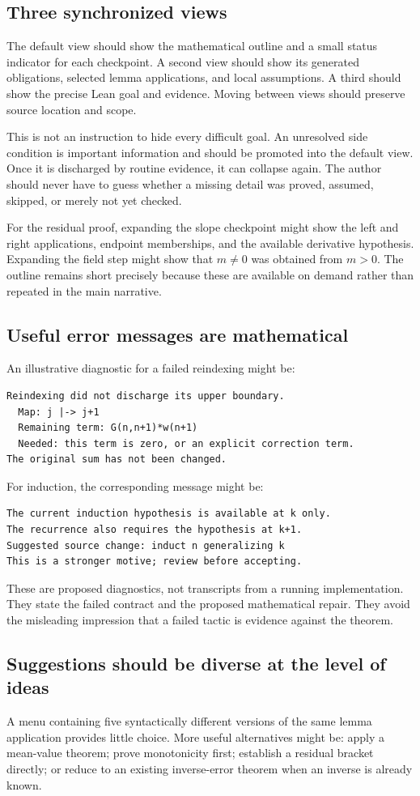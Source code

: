 \documentclass[11pt,a4paper]{article}
\theoremstyle{definition}
\theoremstyle{remark}
\numberwithin{equation}{section}
\begin{document}
\subsection{Three synchronized views}
The default view should show the mathematical outline and a small status indicator for each checkpoint. A second view should show its generated obligations, selected lemma applications, and local assumptions. A third should show the precise Lean goal and evidence. Moving between views should preserve source location and scope.

This is not an instruction to hide every difficult goal. An unresolved side condition is important information and should be promoted into the default view. Once it is discharged by routine evidence, it can collapse again. The author should never have to guess whether a missing detail was proved, assumed, skipped, or merely not yet checked.

For the residual proof, expanding the slope checkpoint might show the left and right applications, endpoint memberships, and the available derivative hypothesis. Expanding the field step might show that $m\ne0$ was obtained from $m>0$. The outline remains short precisely because these are available on demand rather than repeated in the main narrative.

\subsection{Useful error messages are mathematical}
An illustrative diagnostic for a failed reindexing might be:
\begin{lstlisting}
Reindexing did not discharge its upper boundary.
  Map: j |-> j+1
  Remaining term: G(n,n+1)*w(n+1)
  Needed: this term is zero, or an explicit correction term.
The original sum has not been changed.
\end{lstlisting}
For induction, the corresponding message might be:
\begin{lstlisting}
The current induction hypothesis is available at k only.
The recurrence also requires the hypothesis at k+1.
Suggested source change: induct n generalizing k
This is a stronger motive; review before accepting.
\end{lstlisting}
These are proposed diagnostics, not transcripts from a running implementation. They state the failed contract and the proposed mathematical repair. They avoid the misleading impression that a failed tactic is evidence against the theorem.

\subsection{Suggestions should be diverse at the level of ideas}
A menu containing five syntactically different versions of the same lemma application provides little choice. More useful alternatives might be: apply a mean-value theorem; prove monotonicity first; establish a residual bracket directly; or reduce to an existing inverse-error theorem when an inverse is already known.
\end{document}
